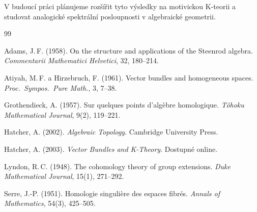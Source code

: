 \documentclass[12pt,a4paper]{article}
\theoremstyle{plain}
\theoremstyle{definition}
\theoremstyle{remark}
\begin{document}
V budouc\'{i} pr\'{a}ci pl\'{a}nujeme roz\v{s}\'{i}\v{r}it tyto v\'{y}sledky na
motivickou K-teorii a studovat analogick\'{e} spektr\'{a}ln\'{i} posloupnosti
v algebraick\'{e} geometrii.

\begin{thebibliography}{99}

Adams, J.\,F. (1958).
On the structure and applications of the Steenrod algebra.
\emph{Commentarii Mathematici Helvetici}, 32, 180--214.

Atiyah, M.\,F. a Hirzebruch, F. (1961).
Vector bundles and homogeneous spaces.
\emph{Proc.\ Sympos.\ Pure Math.}, 3, 7--38.

Grothendieck, A. (1957).
Sur quelques points d'alg\`{e}bre homologique.
\emph{T\^{o}hoku Mathematical Journal}, 9(2), 119--221.

Hatcher, A. (2002).
\emph{Algebraic Topology}.
Cambridge University Press.

Hatcher, A. (2003).
\emph{Vector Bundles and K-Theory}.
Dostupn\'{e} online.

Lyndon, R.\,C. (1948).
The cohomology theory of group extensions.
\emph{Duke Mathematical Journal}, 15(1), 271--292.

Serre, J.-P. (1951).
Homologie singuli\`{e}re des espaces fibr\'{e}s.
\emph{Annals of Mathematics}, 54(3), 425--505.

\end{thebibliography}
\end{document}
